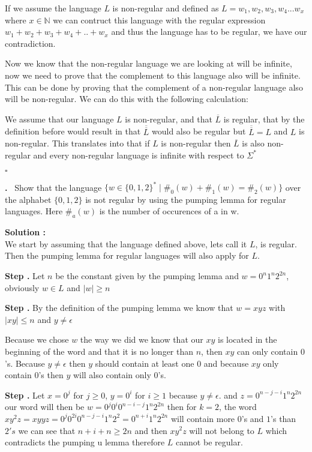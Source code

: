 \documentclass{article}
\newcounter{problem}
\newcounter{solution}
\newcounter{step}
\newcommand\Step{%
  \stepcounter{step}%
  \textbf{Step \thestep. }%
}
\newcommand\Problem{%
  \stepcounter{problem}%
  \textbf{\theproblem.}~%
  \setcounter{solution}{0}%
  \setcounter{step}{0}%
}
\newcommand\TheSolution{%
  \setcounter{step}{0}%
  \textbf{Solution \theproblem:}\\%
}
\begin{document}
If we assume the language $L$ is non-regular and defined as $L ={w_1,w_2,w_3,w_4...w_x}$ where $x \in 
\mathbb{N}$ we can contruct this language with the regular expression $w_1 + w_2 + w_3 + w_4 + .. + w_x$
and thus the language has to be regular, we have our contradiction.

Now we know that the non-regular language we are looking at will be infinite, now we need to prove that 
the complement to this language also will be infinite. This can be done by proving that the complement of
a non-regular language also will be non-regular. We can do this with the following calculation:

We assume that our language $L$ is non-regular, and that $\overline L$ is regular, that by the definition 
before would result in that $\overline {\overline L}$ would also be regular but $\overline {\overline L} = L$
and $L$ is non-regular. This translates into that if $L$ is non-regular then $\overline L$ is also non-
regular and every non-regular language is infinite with respect to $\Sigma^*$

\hfill
$\square$

\newpage
\Problem Show that the language $\{w \in \{0,1,2\}^* \mid \#_0(w) + \#_1(w) =  \#_2(w)\}$ over the 
alphabet $\{0,1,2\}$ is not regular by using the pumping lemma for regular languages. Here $\#_a(w)$ 
is the number of occurences of a in w.

\TheSolution 
We start by assuming that the language defined above, lets call it $L$, is regular. Then the pumping lemma
for regular languages will also apply for $L$.

\Step Let $n$ be the constant given by the pumping lemma 
and $w = 0^n1^n2^{2n}$, obviously $w \in L$ and $|w| \geqslant n$

\Step By the definition of the pumping lemma we know that $w = xyz$ with $|xy| \leqslant n$ and $y \neq 
\epsilon$

Because we chose $w$ the way we did we know that our $xy$ is located in the beginning of the word and 
that it is no longer than $n$, then $xy$ can only contain $0$'s. Because $y \neq \epsilon$ then $y$ should 
contain at least one $0$ and because $xy$ only contain $0$'s then $y$ will also contain only $0$'s.

\Step Let $x = 0^j$ for $j \geqslant 0$, $y = 0^i$ for $i \geqslant 1$ because $y \neq \epsilon$. and
$z = 0^{n-j-i}1^n2^{2n}$ our word will then be $w = 0^j0^i0^{n-i-j}1^n2^{2n}$ then for $k = 2$, the word
$xy^2z = xyyz = 0^j0^{2i}0^{n-j-i}1^n2^{2} = 0^{n+i}1^n2^{2n}$ will contain more $0$'s and $1$'s than $2's$ 
we can see that $n+i+n \geqslant 2n$ and then $xy^2z$ will not belong to $L$ which contradicts the pumping u
lemma therefore $L$ cannot be regular.
\end{document}
